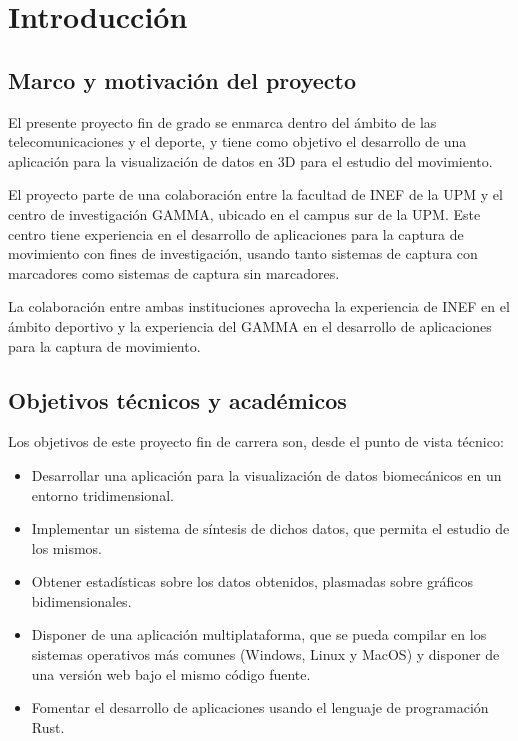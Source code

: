 \chapter{Introducción} \label{sec:cap1}

\section{Marco y motivación del proyecto}


\noindent El presente proyecto fin de grado se enmarca dentro del ámbito de las telecomunicaciones y el deporte, y tiene como objetivo el desarrollo de una aplicación para la visualización de datos en 3D para el estudio del movimiento.

El proyecto parte de una colaboración entre la facultad de \ac{INEF} de la \ac{UPM} y el centro de investigación \ac{GAMMA}, ubicado en el campus sur de la \ac{UPM}. Este centro tiene experiencia en el desarrollo de aplicaciones para la captura de movimiento con fines de investigación, usando tanto sistemas de captura con marcadores como sistemas de captura sin marcadores.

La colaboración entre ambas instituciones aprovecha la experiencia de \ac{INEF} en el ámbito deportivo y la experiencia del \ac{GAMMA} en el desarrollo de aplicaciones para la captura de movimiento.

\section{Objetivos técnicos y académicos}

Los objetivos de este proyecto fin de carrera son, desde el punto de vista técnico:

\begin{itemize}
    \item Desarrollar una aplicación para la visualización de datos biomecánicos en un entorno tridimensional.
    \item Implementar un sistema de síntesis de dichos datos, que permita el estudio de los mismos.
    \item Obtener estadísticas sobre los datos obtenidos, plasmadas sobre gráficos bidimensionales.
    \item Disponer de una aplicación multiplataforma, que se pueda compilar en los sistemas operativos más comunes (Windows, Linux y MacOS) y disponer de una versión web bajo el mismo código fuente.
    \item Fomentar el desarrollo de aplicaciones usando el lenguaje de programación Rust.
\end{itemize}

